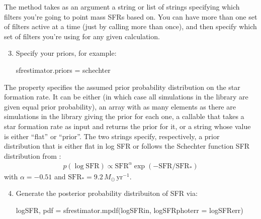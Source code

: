 \documentclass[letterpaper,10pt,english]{sphinxmanual}
\begin{document}
The  method takes as an argument a string or list of strings specifying which filters you’re going to point mass SFRs based on. You can have more than one set of filters active at a time (just by calling  more than once), and then specify which set of filters you’re using for any given calculation.
\begin{enumerate}
\setcounter{enumi}{2}
\item {} 
Specify your priors, for example:

\begin{sphinxVerbatim}[commandchars=\\\{\}]
sfr\PYGZus{}estimator.priors = \PYGZsq{}schechter\PYGZsq{}
\end{sphinxVerbatim}

\end{enumerate}

The  property specifies the assumed prior probability distribution on the star formation rate. It can be either  (in which case all simulations in the library are given equal prior probability), an array with as many elements as there are simulations in the library giving the prior for each one, a callable that takes a star formation rate as input and returns the prior for it, or a string whose value is either “flat” or “prior”. The two strings specify, respectively, a prior distribution that is either flat in log SFR or follows the Schechter function SFR distribution from :
\begin{equation*}
\begin{split}p(\log\mathrm{SFR}) \propto \mathrm{SFR}^{\alpha} \exp(-\mathrm{SFR}/\mathrm{SFR}_*)\end{split}
\end{equation*}
with \(\alpha = -0.51\) and \(\mathrm{SFR}_* = 9.2\,M_\odot\,\mathrm{yr}^{-1}\).
\begin{enumerate}
\setcounter{enumi}{3}
\item {} 
Generate the posterior probability distribuiton of SFR via:

\begin{sphinxVerbatim}[commandchars=\\\{\}]
logSFR, pdf = sfr\PYGZus{}estimator.mpdf(logSFR\PYGZus{}in, logSFRphoterr = logSFR\PYGZus{}err)
\end{sphinxVerbatim}

\end{enumerate}
\end{document}
